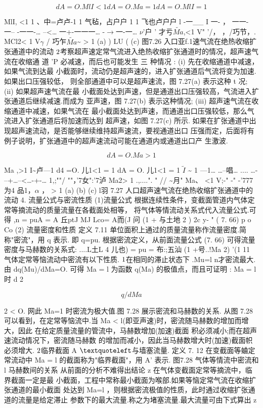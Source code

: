 \[dA=O.MlI <1 dA=O.Ma=1 dA=O.MlI =1\]

MlI, <1 1 、中=卢卢-1 1 气毡，占户户 1 1 飞也卢户户 l -一\_\_ I 一- ， 一一- 一-- -一一-… --<… 一+-一一一… -$\rightarrow$一-一… $\nu$'户 ' 才亏$\tilde{Ma}$,<1 V" '/， ，/巧节，. MCl2< 1 V$\gamma$ / 巧乍$\tilde{Ma}$\textasciitilde{} > 1 (a) ) LU ( (c) 图7.26 入口亚f.1速气流在绝热收缩扩张通道中的流动 ${\rm 2}$考察超声速定常气流进入绝热收缩扩张通道时的情况，超声速气流在收缩通 道 'P 必减速，而后也可能发生 三 种情况 : (i) 先在收缩通道中减速，如果气流到达最 小截面时，流动仍是超声速的，进入扩张通道后气流将变为加速.如果出口压强较低， 则全部通道中可以是超声速流，图 7.27(a) 表示这种 t 况; (ii) 如果超声速气流在最 小截面处达到声速，但是通道出口压强较高，气流进入扩张通道后继续减速.而成为 亚声速，图 7.27(b) 表示这种情况; (iii) 超声速气流在收缩通道中减速，如果气流在 最小截面处达到声速，而通道出口压强较低，那么气流进入扩张通道后将加速而达到 超声速，如图 7.27(c) 所示. 如果在扩张通道中出现超声速流动，是否能够继续维持超声速流，要视通道出口 压强而定，后面将有例子说明，扩张通道中的超声速流动可能在通道内或通道出口产 生激波.

\[dA=O.Ma>1\]

Ma ,>1 I\textasciitilde{}卢---1 d4 =O. 儿1<1 = 1 dA = O. 儿1<1 = 1 $\tilde{I}$ \textasciitilde{} 1 ---1… …--唱… .... …- --+…--<…-+-… 1,;""/ ""，'7女":'7泸 Ma2> 1 .,....". " // \textasciitilde{}月" Ma、 <1 V;-" -" -'777为4 品1，$\alpha$ ， > 1 (a) (b) (c) l羽 7.27 人口超声速气流在绝热收缩扩张通道中的流动 4. 流量公式与密流性质 (1)流量公式 根据连续性条件，变截面管道内气体定常等摘流动的质量流量在各截面处相等， 将气体等情流动关系式代入流量公式.可得 ,n = puA = A 丘ptJ MJ Lco= A而(J 问 (1 + 与土地 2 ) 2c y- " ( 7. 66) p o Co (2) 流量密度和性质 定义 7.11 单位面积上通过的质量流量称作流量密度.简称"密流"，用 q 表示. 即 q=pu. 根据密流定义，从前面流量公式 (7. 66) 可得流量密度与马赫数的关系式: ....L土L 4 儿也) = pu = 布:;五汕 (1 +号..!Ma 2) '(1 11 气体定常等恼流动中密流有以下性质. ${\rm 1}$在相同的滞止状态下 .Mu=l n才密流最大. 由 dq(Mu)/dMa=O. 可得 Ma = l 为函数 q(Ma) 的极值点，而且可证明 : Ma = l 时 d 2

\[q / dMa\]

2 < O. 网此 Ma=1 时密流为极大值.图 7.28 展示密流和马赫数的关系. 从图 7.28 可以看到，在定常等恼流中.当 Ma < l(即亚声速)时，密流随马赫数的增加而增大，因此 在给定质量流量的管流中，马赫数增加(加速)截面 积必须减小;而在超声速流动情况下，密流随马赫数 的增加而减小，因此当马赫数增大时(加速)截面帜 必须增大. ${\rm 2}$临界截面 A ${\rm ‘}$与墙塞流量. 定义 7. 12 在变截面等蛐定常流动中 Ma = l 的截面称为"临界截面"，用 A' 表示. 图7.28 气体等情流中密流和l 马赫数间的关系 从前面的分析不难得出结论 z 在气体变截面定常等摘流中，临界截面一定是最 小截面，工程中常称最小截面为喉部.如果等恼定常气流在收缩扩张通道的最小截面 处达到 Ma=l ，则根据密流极值的性质，此时通过收缩扩张通道的流量是给定滞止 参数下的最大流量.称之为堵塞流量.最大流量可由下式算出 z

